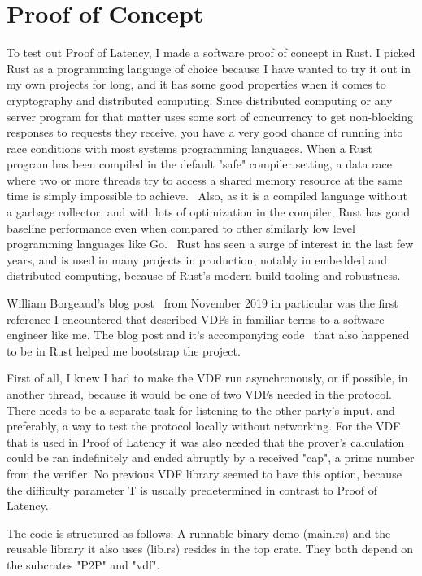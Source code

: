 \chapter{Proof of Concept}
\label{Proof of Concept}
To test out Proof of Latency, I made a software proof of concept in Rust. I picked Rust as a programming language of choice because I have wanted to try it out in my own projects for long, and it has some good properties when it comes to cryptography and distributed computing. Since distributed computing or any server program for that matter uses some sort of concurrency to get non-blocking responses to requests they receive, you have a very good chance of running into race conditions with most systems programming languages. When a Rust program has been compiled in the default "safe" compiler setting, a data race where two or more threads try to access a shared memory resource at the same time is simply impossible to achieve.~\cite{The_Rust_Project_Developers2018-xh} Also, as it is a compiled language without a garbage collector, and with lots of optimization in the compiler, Rust has good baseline performance even when compared to other similarly low level programming languages like Go.~\cite{Howarth2020-zc} Rust has seen a surge of interest in the last few years, and is used in many projects in production, notably in embedded and distributed computing, because of Rust's modern build tooling and robustness.

William Borgeaud's blog post~\cite{Borgeaud2019-wk} from November 2019 in particular was the first reference I encountered that described VDFs in familiar terms to a software engineer like me. The blog post and it's accompanying code~\cite{Borgeaud2019-wk} that also happened to be in Rust helped me bootstrap the project.

First of all, I knew I had to make the VDF run asynchronously, or if possible, in another thread, because it would be one of two VDFs needed in the protocol. There needs to be a separate task for listening to the other party's input, and preferably, a way to test the protocol locally without networking. For the VDF that is used in Proof of Latency it was also needed that the prover's calculation could be ran indefinitely and ended abruptly by a received "cap", a prime number from the verifier. No previous VDF library seemed to have this option, because the difficulty parameter T is usually predetermined in contrast to Proof of Latency.

The code is structured as follows: A runnable binary demo (main.rs) and the reusable library it also uses (lib.rs) resides in the top crate. They both depend on the subcrates "P2P" and "vdf".


